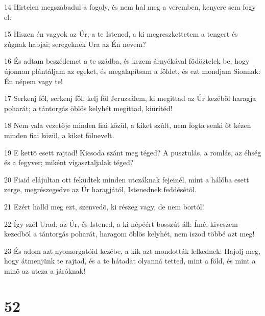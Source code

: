\par 14 Hirtelen megszabadul a fogoly, és nem hal meg a veremben, kenyere sem fogy el:
\par 15 Hiszen én vagyok az Úr, a te Istened, a ki megreszkettetem a tengert és zúgnak habjai; seregeknek Ura az Én nevem?
\par 16 És adtam beszédemet a te szádba, és kezem árnyékával födöztelek be, hogy újonnan plántáljam az egeket, és megalapítsam a földet, és ezt mondjam Sionnak: Én népem vagy te!
\par 17 Serkenj föl, serkenj föl, kelj föl Jeruzsálem, ki megittad az Úr kezébõl haragja poharát; a tántorgás öblös kelyhét megittad, kiürítéd!
\par 18 Nem vala vezetõje minden fiai közül, a kiket szûlt, nem fogta senki õt kézen minden fiai közül, a kiket fölnevelt.
\par 19 E kettõ esett rajtad! Kicsoda szánt meg téged? A pusztulás, a romlás, az éhség és a fegyver; miként vígasztaljalak téged?
\par 20 Fiaid elájultan ott feküdtek minden utczáknak fejeinél, mint a hálóba esett zerge, megrészegedve az Úr haragjától, Istenednek feddésétõl.
\par 21 Ezért halld meg ezt, szenvedõ, ki részeg vagy, de nem bortól!
\par 22 Így szól Urad, az Úr, és Istened, a ki népéért bosszút áll: Ímé, kiveszem kezedbõl a tántorgás poharát, haragom öblös kelyhét, nem iszod többé azt meg!
\par 23 És adom azt nyomorgatóid kezébe, a kik azt mondották lelkednek: Hajolj meg, hogy átmenjünk te rajtad, és a te hátadat olyanná tetted, mint a föld, és mint a minõ az utcza a járóknak!

\chapter{52}


